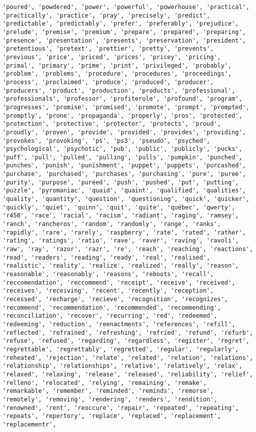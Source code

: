 \documentclass[11pt]{article}
\begin{document}
\begin{Verbatim}[commandchars=\\\{\}]
'poured', 'powdered', 'power', 'powerful', 'powerhouse', 'practical', 'practically', 'practice', 'pray', 'precisely', 'predict', 'predictable', 'predictably', 'prefer', 'preferably', 'prejudice', 'prelude', 'premise', 'premium', 'prepare', 'prepared', 'preparing', 'presence', 'presentation', 'presents', 'preservation', 'president', 'pretentious', 'pretext', 'prettier', 'pretty', 'prevents', 'previous', 'price', 'priced', 'prices', 'pricey', 'pricing', 'primal', 'primary', 'prime', 'print', 'privileged', 'probably', 'problem', 'problems', 'procedure', 'procedures', 'proceedings', 'process', 'proclaimed', 'produce', 'produced', 'producer', 'producers', 'product', 'production', 'products', 'professional', 'professionals', 'professor', 'profiterole', 'profound', 'program', 'progresses', 'promise', 'promised', 'promote', 'prompt', 'prompted', 'promptly', 'prone', 'propaganda', 'properly', 'pros', 'protected', 'protection', 'protective', 'protector', 'protects', 'proud', 'proudly', 'proven', 'provide', 'provided', 'provides', 'providing', 'provokes', 'provoking', 'ps', 'ps3', 'pseudo', 'psyched', 'psychological', 'psychotic', 'pub', 'public', 'publicly', 'pucks', 'puff', 'pull', 'pulled', 'pulling', 'pulls', 'pumpkin', 'punched', 'punches', 'punish', 'punishment', 'puppet', 'puppets', 'purcashed', 'purchase', 'purchased', 'purchases', 'purchasing', 'pure', 'puree', 'purity', 'purpose', 'puréed', 'push', 'pushed', 'put', 'putting', 'puzzle', 'pyromaniac', 'quaid', 'quaint', 'qualified', 'qualities', 'quality', 'quantity', 'question', 'questioning', 'quick', 'quicker', 'quickly', 'quiet', 'quinn', 'quit', 'quite', 'québec', 'qwerty', 'r450', 'race', 'racial', 'racism', 'radiant', 'raging', 'ramsey', 'ranch', 'rancheros', 'random', 'randomly', 'range', 'ranks', 'rapidly', 'rare', 'rarely', 'raspberry', 'rate', 'rated', 'rather', 'rating', 'ratings', 'ratio', 'rave', 'raver', 'raving', 'ravoli', 'raw', 'ray', 'razor', 'razr', 're', 'reach', 'reaching', 'reactions', 'read', 'readers', 'reading', 'ready', 'real', 'realised', 'realistic', 'reality', 'realize', 'realized', 'really', 'reason', 'reasonable', 'reasonably', 'reasons', 'reboots', 'recall', 'reccomendation', 'reccommend', 'receipt', 'receive', 'received', 'receives', 'receiving', 'recent', 'recently', 'reception', 'recessed', 'recharge', 'recieve', 'recognition', 'recognizes', 'recommend', 'recommendation', 'recommended', 'recommending', 'reconciliation', 'recover', 'recurring', 'red', 'redeemed', 'redeeming', 'reduction', 'reenactments', 'references', 'refill', 'reflected', 'refrained', 'refreshing', 'refried', 'refund', 'refurb', 'refuse', 'refused', 'regarding', 'regardless', 'register', 'regret', 'regrettable', 'regrettably', 'regretted', 'regular', 'regularly', 'reheated', 'rejection', 'relate', 'related', 'relation', 'relations', 'relationship', 'relationships', 'relative', 'relatively', 'relax', 'relaxed', 'relaxing', 'release', 'released', 'reliability', 'relief', 'relleno', 'relocated', 'relying', 'remaining', 'remake', 'remarkable', 'remember', 'reminded', 'reminds', 'remorse', 'remotely', 'removing', 'rendering', 'renders', 'rendition', 'renowned', 'rent', 'reoccure', 'repair', 'repeated', 'repeating', 'repeats', 'repertory', 'replace', 'replaced', 'replacement', 'replacementr', 
\end{Verbatim}
\end{document}
